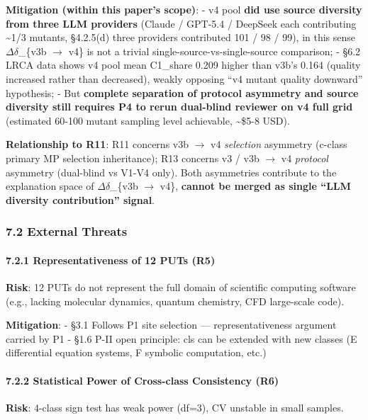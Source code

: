 \documentclass[review,12pt,authoryear]{elsarticle}
\begin{document}
\textbf{Mitigation (within this paper's scope)}: - v4 pool \textbf{did
use source diversity from three LLM providers} (Claude / GPT-5.4 /
DeepSeek each contributing \textasciitilde1/3 mutants, §4.2.5(d) three
providers contributed 101 / 98 / 99), in this sense $\Delta$$\delta$\_\{v3b $\to$ v4\} is
not a trivial single-source-vs-single-source comparison; - §6.2 LRCA
data shows v4 pool mean C1\_share 0.209 higher than v3b's 0.164 (quality
increased rather than decreased), weakly opposing ``v4 mutant quality
downward'' hypothesis; - But \textbf{complete separation of protocol
asymmetry and source diversity still requires P4 to rerun dual-blind
reviewer on v4 full grid} (estimated 60-100 mutant sampling level
achievable, \textasciitilde\$5-8 USD).

\textbf{Relationship to R11}: R11 concerns v3b $\to$ v4 \emph{selection}
asymmetry (c-class primary MP selection inheritance); R13 concerns v3 /
v3b $\to$ v4 \emph{protocol} asymmetry (dual-blind vs V1-V4 only). Both
asymmetries contribute to the explanation space of $\Delta$$\delta$\_\{v3b $\to$ v4\},
\textbf{cannot be merged as single ``LLM diversity contribution''
signal}.

\subsubsection{7.2 External Threats}\label{external-threats}

\paragraph{7.2.1 Representativeness of 12 PUTs
(R5)}\label{representativeness-of-12-puts-r5}

\textbf{Risk}: 12 PUTs do not represent the full domain of scientific
computing software (e.g., lacking molecular dynamics, quantum chemistry,
CFD large-scale code).

\textbf{Mitigation}: - §3.1 Follows P1 site selection ---
representativeness argument carried by P1 - §1.6 P-II open principle:
cls can be extended with new classes (E differential equation systems, F
symbolic computation, etc.)

\paragraph{7.2.2 Statistical Power of Cross-class Consistency
(R6)}\label{statistical-power-of-cross-class-consistency-r6}

\textbf{Risk}: 4-class sign test has weak power (df=3), CV unstable in
small samples.
\end{document}
